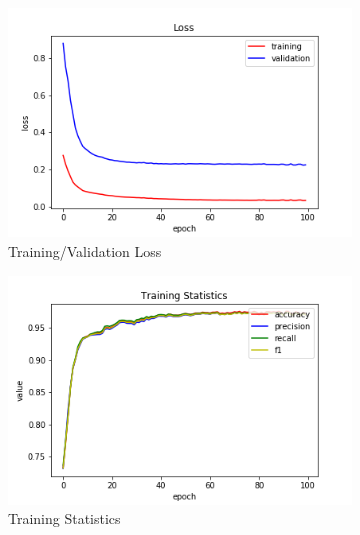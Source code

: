 \begin{figure}[h!]
  \centerfloat
  \begin{subfigure}[b]{0.35\linewidth}
    \includegraphics[width=\linewidth]{images/trained_online_lstm/tile_by_tile_training_uniform_random_fill_10000_model_loss.png}
     \caption{Training/Validation Loss}
  \end{subfigure}
  \hfill
  \begin{subfigure}[b]{0.35\linewidth}
    \includegraphics[width=\linewidth]{images/trained_online_lstm/tile_by_tile_training_uniform_random_fill_10000_model_training_stats.png}
     \caption{Training Statistics}
  \end{subfigure}
  \hfill
  \begin{subfigure}[b]{0.35\linewidth}

\end{subfigure}
\end{figure}
